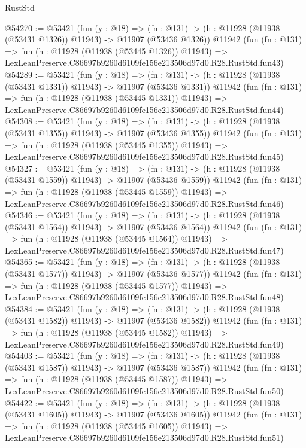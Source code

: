 \begin{lexlean}{RustStd}
\begin{coremodule}
@54270 := @53421
    (fun (y : @18) =>
    (fn : @131) -> (h : @11928 (@11938 (@53431 @1326)) @11943) -> @11907 (@53436 @1326))
    @11942
    (fun (fn : @131) =>
    fun (h : @11928 (@11938 (@53445 @1326)) @11943) =>
    LexLeanPreserve.C86697b9260d6109fe156e213506d97d0.R28.RustStd.fun43)
@54289 := @53421
    (fun (y : @18) =>
    (fn : @131) -> (h : @11928 (@11938 (@53431 @1331)) @11943) -> @11907 (@53436 @1331))
    @11942
    (fun (fn : @131) =>
    fun (h : @11928 (@11938 (@53445 @1331)) @11943) =>
    LexLeanPreserve.C86697b9260d6109fe156e213506d97d0.R28.RustStd.fun44)
@54308 := @53421
    (fun (y : @18) =>
    (fn : @131) -> (h : @11928 (@11938 (@53431 @1355)) @11943) -> @11907 (@53436 @1355))
    @11942
    (fun (fn : @131) =>
    fun (h : @11928 (@11938 (@53445 @1355)) @11943) =>
    LexLeanPreserve.C86697b9260d6109fe156e213506d97d0.R28.RustStd.fun45)
@54327 := @53421
    (fun (y : @18) =>
    (fn : @131) -> (h : @11928 (@11938 (@53431 @1559)) @11943) -> @11907 (@53436 @1559))
    @11942
    (fun (fn : @131) =>
    fun (h : @11928 (@11938 (@53445 @1559)) @11943) =>
    LexLeanPreserve.C86697b9260d6109fe156e213506d97d0.R28.RustStd.fun46)
@54346 := @53421
    (fun (y : @18) =>
    (fn : @131) -> (h : @11928 (@11938 (@53431 @1564)) @11943) -> @11907 (@53436 @1564))
    @11942
    (fun (fn : @131) =>
    fun (h : @11928 (@11938 (@53445 @1564)) @11943) =>
    LexLeanPreserve.C86697b9260d6109fe156e213506d97d0.R28.RustStd.fun47)
@54365 := @53421
    (fun (y : @18) =>
    (fn : @131) -> (h : @11928 (@11938 (@53431 @1577)) @11943) -> @11907 (@53436 @1577))
    @11942
    (fun (fn : @131) =>
    fun (h : @11928 (@11938 (@53445 @1577)) @11943) =>
    LexLeanPreserve.C86697b9260d6109fe156e213506d97d0.R28.RustStd.fun48)
@54384 := @53421
    (fun (y : @18) =>
    (fn : @131) -> (h : @11928 (@11938 (@53431 @1582)) @11943) -> @11907 (@53436 @1582))
    @11942
    (fun (fn : @131) =>
    fun (h : @11928 (@11938 (@53445 @1582)) @11943) =>
    LexLeanPreserve.C86697b9260d6109fe156e213506d97d0.R28.RustStd.fun49)
@54403 := @53421
    (fun (y : @18) =>
    (fn : @131) -> (h : @11928 (@11938 (@53431 @1587)) @11943) -> @11907 (@53436 @1587))
    @11942
    (fun (fn : @131) =>
    fun (h : @11928 (@11938 (@53445 @1587)) @11943) =>
    LexLeanPreserve.C86697b9260d6109fe156e213506d97d0.R28.RustStd.fun50)
@54422 := @53421
    (fun (y : @18) =>
    (fn : @131) -> (h : @11928 (@11938 (@53431 @1605)) @11943) -> @11907 (@53436 @1605))
    @11942
    (fun (fn : @131) =>
    fun (h : @11928 (@11938 (@53445 @1605)) @11943) =>
    LexLeanPreserve.C86697b9260d6109fe156e213506d97d0.R28.RustStd.fun51)

\end{coremodule}
\end{lexlean}
